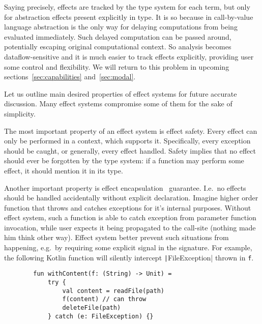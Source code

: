 \documentclass[conference]{IEEEtran}
\begin{document}
    Saying precisely, effects are tracked by the type system for each term, but only for abstraction effects present explicitly in type.
    It is so because in call-by-value language abstraction is the only way for delaying computations from being evaluated immediately.
    Such delayed computation can be passed around, potentially escaping original computational context.
    So analysis becomes dataflow-sensitive and it is much easier to track effects explicitly, providing user some control and flexibility.
    We will return to this problem in upcoming sections~\ref{sec:capabilities} and~\ref{sec:modal}.

    Let us outline main desired properties of effect systems for future accurate discussion.
    Many effect systems compromise some of them for the sake of simplicity.

    The most important property of an effect system is effect safety.
    Every effect can only be performed in a context, which supports it.
    Specifically, every exception should be caught, or generally, every effect handled.
    Safety implies that no effect should ever be forgotten by the type system: if a function may perform some effect, it should mention it in its type.

    Another important property is effect encapsulation~\cite{lindley2018encapsulating} guarantee.
    I.e.\ no effects should be handled accidentally without explicit declaration.
    Imagine higher order function that throws and catches exceptions for it's internal purposes.
    Without effect system, such a function is able to catch exception from parameter function invocation, while user expects it being propagated to the call-site (nothing made him think other way).
    Effect system better prevent such situations from happening, e.g.\ by requiring some explicit signal in the signature.
    For example, the following Kotlin function will silently intercept \texttt|FileException| thrown in \texttt{f}.
    \begin{verbatim}
        fun withContent(f: (String) -> Unit) =
            try {
                val content = readFile(path)
                f(content) // can throw
                deleteFile(path)
            } catch (e: FileException) {}
    \end{verbatim}
\end{document}

